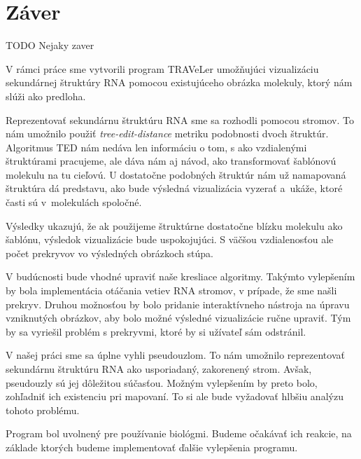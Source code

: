 \chapter*{Záver}

TODO Nejaky zaver

V rámci práce sme vytvorili program TRAVeLer umožňujúci
vizualizáciu sekundárnej štruktúry RNA pomocou existujúceho
obrázka molekuly, ktorý nám slúži ako predloha.

Reprezentovať sekundárnu štruktúru RNA sme sa rozhodli pomocou
stromov. To nám umožnilo použiť \textit{tree-edit-distance}
metriku podobnosti dvoch štruktúr.
Algoritmus TED nám nedáva len informáciu o tom,
s ako vzdialenými štruktúrami pracujeme, ale dáva nám
aj návod, ako transformovať šablónovú molekulu na tu cieľovú.
U dostatočne podobných štruktúr nám už namapovaná štruktúra
dá predstavu, ako bude výsledná vizualizácia vyzerať
a~ukáže, ktoré časti sú v~molekulách spoločné.

Výsledky ukazujú, že ak použijeme štruktúrne dostatočne blízku
molekulu ako šablónu, výsledok vizualizácie bude uspokojujúci.
S väčšou vzdialenosťou ale počet prekryvov vo výsledných obrázkoch
stúpa.

V budúcnosti bude vhodné upraviť naše kresliace algoritmy.
Takýmto vylepšením by bola implementácia otáčania vetiev RNA stromov,
v prípade, že sme našli prekryv.
Druhou možnosťou by bolo pridanie interaktívneho nástroja na úpravu
vzniknutých obrázkov, aby bolo možné výsledné vizualizácie ručne upraviť.
Tým by sa vyriešil problém s prekryvmi, ktoré by si užívateľ sám odstránil.

V našej práci sme sa úplne vyhli pseudouzlom. To nám umožnilo
reprezentovať sekundárnu štruktúru RNA ako usporiadaný, zakorenený strom.
Avšak, pseudouzly sú jej dôležitou súčasťou.
Možným vylepšením by preto bolo, zohľadniť ich existenciu pri mapovaní.
To si ale bude vyžadovať hlbšiu analýzu tohoto problému.

Program bol uvolnený pre používanie biológmi. Budeme očakávať ich reakcie,
na základe ktorých budeme implementovať ďalšie vylepšenia programu.

